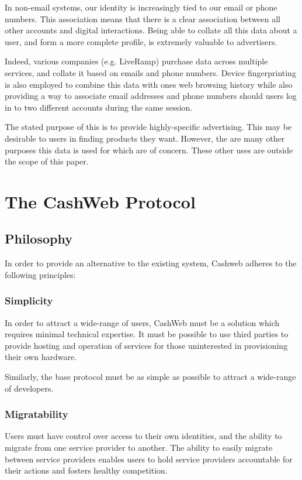 \documentclass{article}
\begin{document}
In non-email systems, our identity is increasingly tied to our email or phone numbers. This association means that there is a clear association between all other accounts and digital interactions. Being able to collate all this data about a user, and form a more complete profile, is extremely valuable to advertisers.

Indeed, various companies (e.g. LiveRamp) purchase data across multiple services, and collate it based on emails and phone numbers. Device fingerprinting is also employed to combine this data with ones web browsing history while also providing a way to associate email addresses and phone numbers should users log in to two different accounts during the same session.

The stated purpose of this is to provide highly-specific advertising. This may be desirable to users in finding products they want. However, the are many other purposes this data is used for which are of concern. These other uses are outside the scope of this paper.

\section{The CashWeb Protocol}

\subsection{Philosophy}

In order to provide an alternative to the existing system, Cashweb adheres to the following principles:

\subsubsection{Simplicity}

In order to attract a wide-range of users, CashWeb must be a solution which requires minimal technical expertise. It must be possible to use third parties to provide hosting and operation of services for those uninterested in provisioning their own hardware.

Similarly, the base protocol must be as simple as possible to attract a wide-range of developers.

\subsubsection{Migratability}

Users must have control over access to their own identities, and the ability to migrate from one service provider to another. The ability to easily migrate between service providers enables users to hold service providers accountable for their actions and fosters healthy competition.
\end{document}
